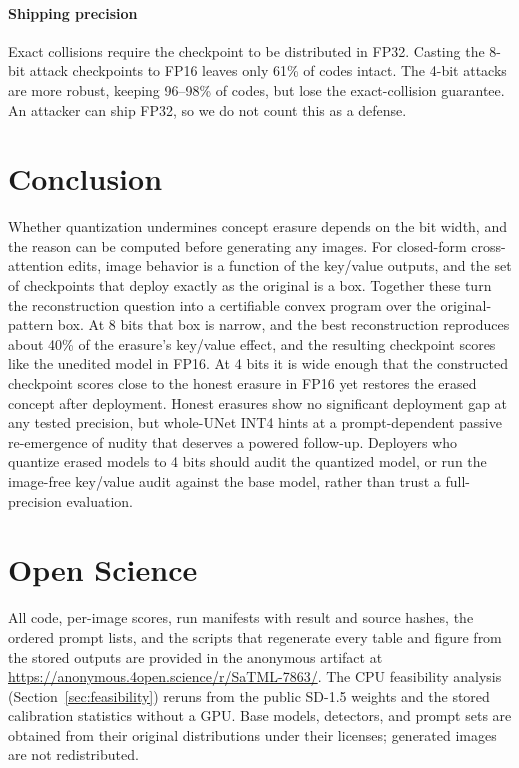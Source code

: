 \documentclass[conference]{IEEEtran}
\begin{document}
\paragraph{Shipping precision}
Exact collisions require the checkpoint to be distributed in FP32. Casting the 8-bit
attack checkpoints to FP16 leaves only 61\% of codes intact. The 4-bit attacks are
more robust, keeping 96--98\% of codes, but lose the exact-collision guarantee. An attacker can ship FP32, so we do not count this as a defense.
\section{Conclusion}
Whether quantization undermines concept erasure depends on the bit width, and the
reason can be computed before generating any images. For closed-form cross-attention
edits, image behavior is a function of the key/value outputs, and the set of
checkpoints that deploy exactly as the original is a box. Together these turn the
reconstruction question into a certifiable convex program over the original-pattern
box. At 8 bits that box is narrow, and the best reconstruction reproduces about 40\% of the
erasure's key/value effect, and the resulting checkpoint scores like the unedited model
in FP16. At 4 bits it is wide enough that the constructed checkpoint scores close to
the honest erasure in FP16 yet restores the erased concept after deployment. Honest erasures show no significant deployment gap at any tested
precision, but whole-UNet INT4 hints at a prompt-dependent passive re-emergence of
nudity that deserves a powered follow-up. Deployers who quantize
erased models to 4 bits should audit the quantized model, or run the image-free
key/value audit against the base model, rather than trust a full-precision
evaluation.

\section*{Open Science}
All code, per-image scores, run manifests with result and source hashes, the ordered
prompt lists, and the scripts that regenerate every table and figure from the stored
outputs are provided in the anonymous artifact at \url{https://anonymous.4open.science/r/SaTML-7863/}. The CPU
feasibility analysis (Section~\ref{sec:feasibility}) reruns from the public SD-1.5
weights and the stored calibration statistics without a GPU. Base models, detectors,
and prompt sets are obtained from their original distributions under their licenses;
generated images are not redistributed.
\end{document}
